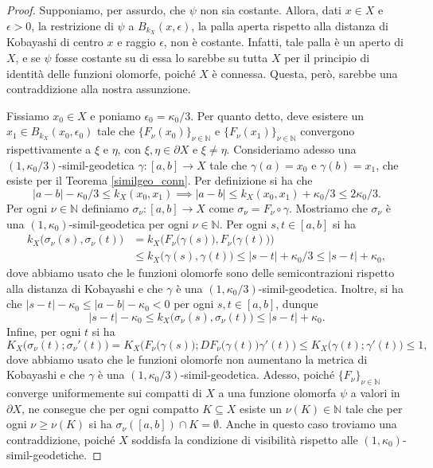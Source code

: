 \begin{proof}
    Supponiamo, per assurdo, che $\psi$ non sia costante. Allora, dati $x \in X$ e $\epsilon>0$, la restrizione di $\psi$ a $B_{k_X}(x,\epsilon)$, la palla aperta rispetto alla distanza di Kobayashi di centro $x$ e raggio $\epsilon$, non è costante. Infatti, tale palla è un aperto di $X$, e se $\psi$ fosse costante su di essa lo sarebbe su tutta $X$ per il principio di identità delle funzioni olomorfe, poiché $X$ è connessa. Questa, però, sarebbe una contraddizione alla nostra assunzione.

    Fissiamo $x_0 \in X$ e poniamo $\epsilon_0=\kappa_0/3$. Per quanto detto, deve esistere un $x_1 \in B_{k_X}(x_0,\epsilon_0)$ tale che $\{F_\nu(x_0)\}_{\nu\in\mathbb{N}}$ e $\{F_\nu(x_1)\}_{\nu\in\mathbb{N}}$ convergono rispettivamente a $\xi$ e $\eta$, con $\xi,\eta \in \partial X$ e $\xi\not=\eta$. Consideriamo adesso una $(1,\kappa_0/3)$-simil-geodetica $\gamma:[a,b]\longrightarrow X$ tale che $\gamma(a)=x_0$ e $\gamma(b)=x_1$, che esiste per il Teorema \ref{similgeo_conn}. Per definizione si ha che
    $$|a-b|-\kappa_0/3 \le k_X(x_0,x_1) \implies |a-b| \le k_X(x_0,x_1)+\kappa_0/3 \le 2\kappa_0/3.$$
    Per ogni $\nu\in\mathbb{N}$ definiamo $\sigma_\nu:[a,b]\longrightarrow X$ come $\sigma_\nu=F_\nu\circ\gamma$. Mostriamo che $\sigma_\nu$ è una $(1,\kappa_0)$-simil-geodetica per ogni $\nu\in\mathbb{N}$. Per ogni $s,t \in [a,b]$ si ha
    \begin{align*}k_X\big(\sigma_\nu(s),\sigma_\nu(t)\big)&=k_X\Big(F_\nu\big(\gamma(s)\big),F_\nu\big(\gamma(t)\big)\Big)\\
        &\le k_X\big(\gamma(s),\gamma(t)\big) \le |s-t|+\kappa_0/3 \le |s-t|+\kappa_0,
    \end{align*}
    dove abbiamo usato che le funzioni olomorfe sono delle semicontrazioni rispetto alla distanza di Kobayashi e che $\gamma$ è una $(1,\kappa_0/3)$-simil-geodetica. Inoltre, si ha che $|s-t|-\kappa_0 \le |a-b|-\kappa_0 <0$ per ogni $s,t \in [a,b]$, dunque
    $$|s-t|-\kappa_0 \le k_X\big(\sigma_\nu(s),\sigma_\nu(t)\big) \le |s-t|+\kappa_0.$$
    Infine, per ogni $t$ si ha
    $$K_X\big(\sigma_\nu(t);\sigma_\nu'(t)\big)=K_X\Big(F_\nu\big(\gamma(s)\big);DF_\nu\big(\gamma(t)\big)\gamma'(t)\Big) \le K_X\big(\gamma(t);\gamma'(t)\big) \le 1,$$
    dove abbiamo usato che le funzioni olomorfe non aumentano la metrica di Kobayashi e che $\gamma$ è una $(1,\kappa_0/3)$-simil-geodetica. Adesso, poiché $\{F_\nu\}_{\nu\in\mathbb{N}}$ converge uniformemente sui compatti di $X$ a una funzione olomorfa $\psi$ a valori in $\partial X$, ne consegue che per ogni compatto $K\subseteq X$ esiste un $\nu(K)\in\mathbb{N}$ tale che per ogni $\nu\ge\nu(K)$ si ha $\sigma_\nu([a,b])\cap K=\emptyset$. Anche in questo caso troviamo una contraddizione, poiché $X$ soddisfa la condizione di visibilità rispetto alle $(1,\kappa_0)$-simil-geodetiche.
\end{proof}